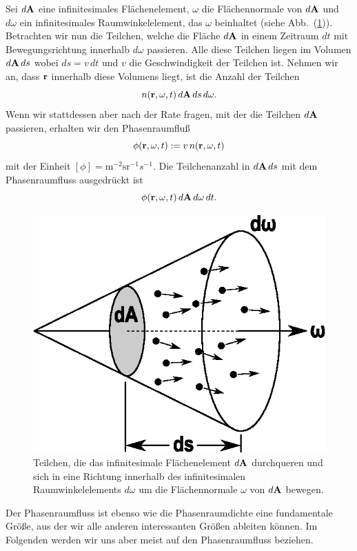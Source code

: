 	Sei $d\mathbf{A}$ eine infinitesimales Flächenelement, $\omega$ die Flächennormale von $d\mathbf{A}$ und $d\omega$ ein infinitesimales Raumwinkelelement, das $\omega$ beinhaltet (siehe Abb.~(\ref{fig:phasespacefluxsurface})). Betrachten wir nun die Teilchen, welche die Fläche $d\mathbf{A}$ in einem Zeitraum $dt$ mit Bewegungsrichtung innerhalb $d\omega$ passieren. Alle diese Teilchen liegen im Volumen $d\mathbf{A}\,ds$ wobei $ds=v\,dt$ und $v$ die Geschwindigkeit der Teilchen ist. Nehmen wir an, dass $\mathbf{r}$ innerhalb diese Volumens liegt, ist die Anzahl der Teilchen $$n(\mathbf{r},\omega,t)\,d\mathbf{A}\,ds\,d\omega.$$ Wenn wir stattdessen aber nach der Rate fragen, mit der die Teilchen $d\mathbf{A}$ passieren, erhalten wir den Phasenraumfluß $$\phi(\mathbf{r},\omega,t):=v\,n(\mathbf{r},\omega,t)$$ mit der Einheit $[\phi]=\text{m}^{-2}\text{sr}^{-1}s^{-1}$. Die Teilchenanzahl in $d\mathbf{A}\,ds$ mit dem Phasenraumfluss ausgedrückt ist $$\phi(\mathbf{r},\omega,t)\,d\mathbf{A}\,d\omega\,dt.$$
	\begin{figure}
		\centering
		\includegraphics[height=0.3\textheight]{phasespacefluxsurface.eps}
		\caption{Teilchen, die das infinitesimale Flächenelement $d\mathbf{A}$ durchqueren und sich in eine Richtung innerhalb des infinitesimalen Raumwinkelelements $d\omega$ um die Flächennormale $\omega$ von $d\mathbf{A}$ bewegen.}
		\label{fig:phasespacefluxsurface}
	\end{figure}
	Der Phasenraumfluss ist ebenso wie die Phasenraumdichte eine fundamentale Größe, aus der wir alle anderen interessanten Größen ableiten können. Im Folgenden werden wir uns aber meist auf den Phasenraumfluss beziehen.
		
